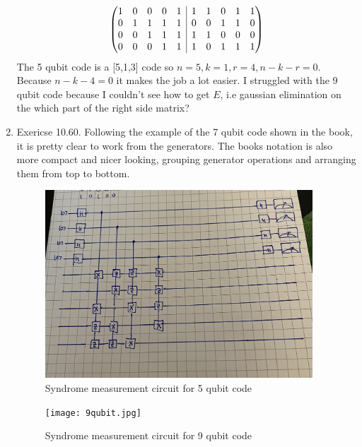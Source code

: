 \documentclass[12pt]{article}
\newcommand{\rvline}{\hspace*{-\arraycolsep}\vline\hspace*{-\arraycolsep}}
\begin{document}
\begin{enumerate}
    $$ \begin{pmatrix}
        \begin{matrix}
            1 & 0 & 0 & 0 & 1  \\
            0 & 1 & 1 & 1 & 1  \\
            0 & 0 & 1 & 1 & 1 \\
            0 & 0 & 0 & 1 & 1 
        \end{matrix} & \rvline &
        \begin{matrix}
            1 & 1 & 0 & 1 & 1 \\
         0 & 0 & 1 & 1 & 0 \\
         1 & 1 & 0 & 0 & 0 \\
           1 & 0 & 1 & 1 & 1 \\
        \end{matrix} 
    \end{pmatrix} $$
    The 5 qubit code is a [5,1,3] code so $n=5, k=1, r=4, n-k-r=0$. Because $n-k-4 =0$ it makes the job a lot easier. I struggled with the 9 qubit code because I couldn't see how to get $E$, i.e gaussian elimination on the which part of the right side matrix? 

    \item Exericse 10.60. Following the example of the 7 qubit code shown in the book, it is pretty clear to work from the generators. The books notation is also more compact and nicer looking, grouping generator operations and arranging them from top to bottom.
    \begin{figure}[h]
        \includegraphics[width=10cm]{5qubit.jpg}
        \centering
        \caption{Syndrome measurement circuit for 5 qubit code}

    \end{figure}
    \begin{figure}[h]
        \texttt{[image: 9qubit.jpg]}
        \centering
        \caption{Syndrome measurement circuit for 9 qubit code}

    \end{figure}
\end{enumerate}
\end{document}
